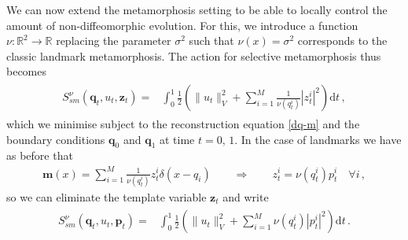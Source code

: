 \documentclass[runningheads]{llncs}
\newcommand{\half}{\frac 12}
\newcommand{\norm}[2]{\| #1 \|_{ #2 }}
\newcommand{\vnorm}[1]{\norm{ #1 }{V}}
\newcommand{\diff}[1]{\text{d} #1}
\begin{document}
We can now extend the metamorphosis setting to be able to locally control the
amount of non-diffeomorphic evolution.  For this, we introduce a function $\nu:
\mathbb R^2\to \mathbb R$ replacing the parameter $\sigma^2$ such that
$\nu(x)=\sigma^2$ corresponds to the classic landmark metamorphosis. The action 
for selective metamorphosis thus becomes 
\begin{align}
  \begin{split}
    S_{sm}^\nu(\mathbf q_t, u_t, \mathbf z_t) = & \int_0^1
    \half  \left (\vnorm{u_t}^2 +\sum_{i=1}^M \frac{1}{\nu(q_t^i)}|z_t^i|^2\right )\diff{t}\, , 
  \end{split}
  \label{E_sm-def}
\end{align}
which we minimise subject to the reconstruction equation \eqref{dq-m} and the
boundary conditions $\mathbf q_0$ and $\mathbf q_1$ at time $t=0,\,1$. In the
case of landmarks we have as before that
\begin{align}\label{zp_relation}
  \mathbf m(x) = \sum_{i=1}^M \frac{1}{\nu(q_t^i)} z_t^i\delta(x-q_i)\qquad \Rightarrow \qquad
  z_t^i = \nu(q_t^i) p_t^i\quad \forall i\, , 
\end{align}
so we can eliminate the template variable $\mathbf z_t$ and write  
\begin{align}
  \begin{split}
    S_{sm}^\nu(\mathbf q_t, u_t, \mathbf p_t) = & \int_0^1
    \half  \left (\|u_t\|_V^2  +\sum_{i=1}^M \nu(q_t^i)|p_t^i|^2\right )\diff{t}\, . 
  \end{split}
  \label{E_sm-def_p}
\end{align}
\end{document}
